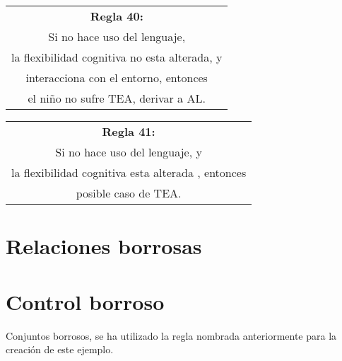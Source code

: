 \documentclass[letterpaper,12pt]{article}
\begin{document}
\begin{center}
	\begin{tabular}{|c|}
		\hline 
		\textbf{Regla 40:} \\
		Si no hace uso del lenguaje,\\
		la flexibilidad cognitiva no esta alterada, y\\
		interacciona con el entorno, entonces\\
		el niño no sufre TEA, derivar a AL.\\
\hline 
\end{tabular} 
\end{center}		
		
\begin{center}
	\begin{tabular}{|c|}
		\hline 
		\textbf{Regla 41:} \\
		Si no hace uso del lenguaje, y\\
		la flexibilidad cognitiva esta alterada , entonces \\
		posible caso de TEA. \\
\hline 
\end{tabular} 
\end{center}
\newpage
\section{Relaciones borrosas}
\begin{figure}[h!]
	\begin{subfigure}
		\texttt{[image: "Documento 6(1)\_page-0001"]}
	\end{subfigure}
	\hfill
	\begin{subfigure}
		\texttt{[image: "Foto\_page-0001"]}
	\end{subfigure}
\end{figure}
\newpage
\section{Control borroso}
Conjuntos borrosos, se ha utilizado la regla nombrada anteriormente para la creación de este ejemplo.

\begin{figure}[h!]
	\begin{subfigure}
		\texttt{[image: Lenguaje.png]}
	\end{subfigure}
	\hfill
	\begin{subfigure}
		\texttt{[image: lengu.png]}
	\end{subfigure}
\end{figure}
\end{document}
